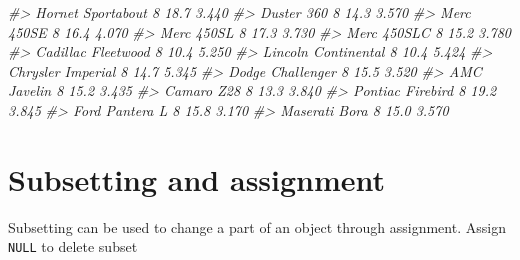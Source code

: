 \documentclass[]{book}
\newenvironment{Shaded}{}{}
\newcommand{\CommentTok}[1]{\textcolor[rgb]{0.38,0.63,0.69}{\textit{#1}}}
\newcommand{\DecValTok}[1]{\textcolor[rgb]{0.25,0.63,0.44}{#1}}
\newcommand{\KeywordTok}[1]{\textcolor[rgb]{0.00,0.44,0.13}{\textbf{#1}}}
\newcommand{\NormalTok}[1]{#1}
\newcommand{\OperatorTok}[1]{\textcolor[rgb]{0.40,0.40,0.40}{#1}}
\newcommand{\OtherTok}[1]{\textcolor[rgb]{0.00,0.44,0.13}{#1}}
\theoremstyle{definition}
\theoremstyle{definition}
\theoremstyle{definition}
\theoremstyle{remark}
\begin{document}
\begin{Shaded}
\begin{Highlighting}[]
\CommentTok{#> Hornet Sportabout     8 18.7 3.440}
\CommentTok{#> Duster 360            8 14.3 3.570}
\CommentTok{#> Merc 450SE            8 16.4 4.070}
\CommentTok{#> Merc 450SL            8 17.3 3.730}
\CommentTok{#> Merc 450SLC           8 15.2 3.780}
\CommentTok{#> Cadillac Fleetwood    8 10.4 5.250}
\CommentTok{#> Lincoln Continental   8 10.4 5.424}
\CommentTok{#> Chrysler Imperial     8 14.7 5.345}
\CommentTok{#> Dodge Challenger      8 15.5 3.520}
\CommentTok{#> AMC Javelin           8 15.2 3.435}
\CommentTok{#> Camaro Z28            8 13.3 3.840}
\CommentTok{#> Pontiac Firebird      8 19.2 3.845}
\CommentTok{#> Ford Pantera L        8 15.8 3.170}
\CommentTok{#> Maserati Bora         8 15.0 3.570}
\end{Highlighting}
\end{Shaded}

\hypertarget{subsetting-and-assignment}{%
\section{Subsetting and assignment}\label{subsetting-and-assignment}}

Subsetting can be used to change a part of an object through assignment.
Assign \texttt{NULL} to delete subset

\begin{Shaded}
\end{Shaded}
\end{document}
